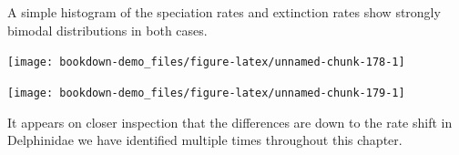 \documentclass[
]{book}
\newenvironment{Shaded}{\begin{snugshade}}{\end{snugshade}}
\newcommand{\DataTypeTok}[1]{\textcolor[rgb]{0.13,0.29,0.53}{#1}}
\newcommand{\KeywordTok}[1]{\textcolor[rgb]{0.13,0.29,0.53}{\textbf{#1}}}
\newcommand{\NormalTok}[1]{#1}
\newcommand{\OperatorTok}[1]{\textcolor[rgb]{0.81,0.36,0.00}{\textbf{#1}}}
\newcommand{\StringTok}[1]{\textcolor[rgb]{0.31,0.60,0.02}{#1}}
\begin{document}
A simple histogram of the speciation rates and extinction rates show strongly bimodal distributions in both cases.

\begin{Shaded}
\end{Shaded}

\begin{center}\texttt{[image: bookdown-demo\_files/figure-latex/unnamed-chunk-178-1]} \end{center}

\begin{Shaded}
\end{Shaded}

\begin{center}\texttt{[image: bookdown-demo\_files/figure-latex/unnamed-chunk-179-1]} \end{center}

It appears on closer inspection that the differences are down to the rate shift in Delphinidae we have identified multiple times throughout this chapter.
\end{document}
